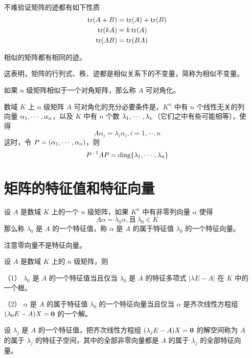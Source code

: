 不难验证矩阵的迹都有如下性质
\begin{equation*}
	\begin{aligned}
		\operatorname{tr}(A+B) & = \operatorname{tr}(A) + \operatorname{tr}(B) \\
		\operatorname{tr}(kA)  & = k\operatorname{tr}(A)         \\
		\operatorname{tr}(AB)  & = \operatorname{tr}(BA)
	\end{aligned}
\end{equation*}

\begin{theorem}
	相似的矩阵都有相同的迹。
\end{theorem}

这表明，矩阵的行列式、秩、迹都是相似关系下的不变量，简称为相似不变量。

如果 $n$ 级矩阵相似于一个对角矩阵，那么称 $A$ 可对角化。

\begin{theorem}
	数域 $K$ 上 $n$ 级矩阵 $A$ 可对角化的充分必要条件是，$K^n$ 中有 $n$ 个线性无关的列向量 $\alpha_1,\cdots,\alpha_n$，以及 $K$ 中有 $n$ 个数 $\lambda_1,\cdots,\lambda_n$（它们之中有些可能相等），使得
	\[A\alpha_i = \lambda_i \alpha_i, i=1,\cdots,n\]
	这时，令 $P = (\alpha_1,\cdots,\alpha_n)$，则
	\[P^{-1}AP = \operatorname{diag}\{\lambda_1,\cdots,\lambda_n\}\]
\end{theorem}

\section{矩阵的特征值和特征向量}

\begin{definition}
	设 $A$ 是数域 $K$ 上的一个 $n$ 级矩阵，如果 $K^n$ 中有非零列向量 $\alpha$ 使得
	\[A \alpha = \lambda_0\alpha,\text{且}\ \lambda_0\in K\]
	那么称 $\lambda_0$ 是 $A$ 的一个特征值，称 $\alpha$ 是 $A$ 的属于特征值 $\lambda_0$ 的一个特征向量。
\end{definition}

注意零向量不是特征向量。

\begin{theorem}
	设 $A$ 是数域 $K$ 上的 $n$ 级矩阵，则
	
	（1） $\lambda_0$ 是 $A$ 的一个特征值当且仅当 $\lambda_0$ 是 $A$ 的特征多项式 $|\lambda E-A|$ 在 $K$ 中的一个根。
	
	（2） $\alpha$ 是 $A$ 的属于特征值 $\lambda_0$ 的一个特征向量当且仅当 $\alpha$ 是齐次线性方程组 $(\lambda_0E-A)X = \boldsymbol{0}$  的一个解。
\end{theorem}

设 $\lambda_j$ 是 $A$ 的一个特征值，把齐次线性方程组 $(\lambda_jE-A)X = \boldsymbol{0}$ 的解空间称为 $A$ 的属于 $\lambda_j$ 的特征子空间，其中的全部非零向量都是 $A$ 的属于 $\lambda_j$ 的全部特征向量。


